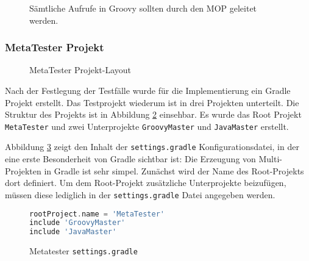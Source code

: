\begin{figure}[hbt!]
	\centering
	
	\caption{Sämtliche Aufrufe in Groovy sollten durch den MOP geleitet werden.}
	\label{fig:meta-mop}
\end{figure}


\subsubsection{MetaTester Projekt}


\begin{figure} [hbt!]
\centering
\begin{minipage}{10cm}
\end{minipage}
	\caption{MetaTester Projekt-Layout}
	\label{fig:meta-tester}
\end{figure}


Nach der Festlegung der Testfälle wurde für die Implementierung ein Gradle Projekt erstellt. 
Das Testprojekt wiederum ist in drei Projekten unterteilt. 
Die Struktur des Projekts ist in Abbildung \ref{fig:meta-tester} einsehbar. 
Es wurde das Root Projekt \texttt{MetaTester} und zwei Unterprojekte \texttt{GroovyMaster} und \texttt{JavaMaster} erstellt. 

Abbildung \ref{fig:mt-settings.gradle} zeigt den Inhalt der \texttt{settings.gradle} Konfigurationsdatei, in der eine erste Besonderheit von Gradle sichtbar ist:
Die Erzeugung von Multi-Projekten in Gradle ist sehr simpel.
Zunächst wird der Name des Root-Projekts dort definiert. 
Um dem Root-Projekt zusätzliche Unterprojekte beizufügen, müssen diese lediglich in der \texttt{settings.gradle} Datei angegeben werden. 


\begin{figure}[hbt!]
\begin{lstlisting}[language=groovy]
rootProject.name = 'MetaTester'
include 'GroovyMaster'
include 'JavaMaster'
\end{lstlisting}
\caption{Metatester \texttt{settings.gradle}}
\label{fig:mt-settings.gradle}
\end{figure}


